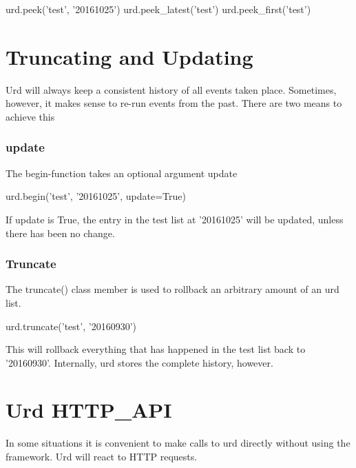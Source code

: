 \begin{python}
  urd.peek('test', '20161025')
  urd.peek_latest('test')
  urd.peek_first('test')
\end{python}



\section{Truncating and Updating}

Urd will always keep a consistent history of all events taken place.
Sometimes, however, it makes sense to re-run events from the past.
There are two means to achieve this

\subsubsection{update}
The begin-function takes an optional argument update

\begin{python}
  urd.begin('test', '20161025', update=True)
\end{python}
If update is True, the entry in the test list at '20161025' will be
updated, unless there has been no change.

\subsubsection{Truncate}

The truncate() class member is used to rollback an arbitrary amount of
an urd list.

\begin{python}
  urd.truncate('test', '20160930')
\end{python}
This will rollback everything that has happened in the test list back
to '20160930'.  Internally, urd stores the complete history, however.



\section{Urd HTTP\_API}

In some situations it is convenient to make calls to urd directly
without using the framework.  Urd will react to HTTP requests.

